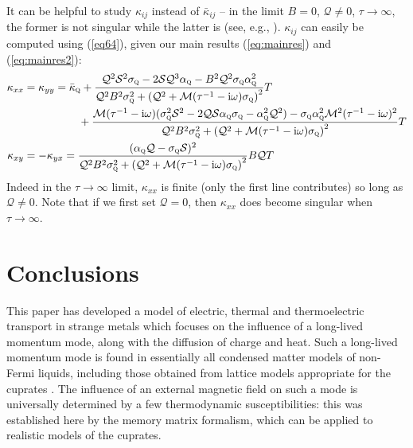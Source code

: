 \documentclass[10pt, oneside]{book}
\begin{document}
\begin{doublespace}
It can be helpful to study $\kappa_{ij}$ instead of $\bar\kappa_{ij}$ -- in the limit $B=0$, $\mathcal{Q}\ne0$, $\tau\rightarrow \infty$,  the former is not singular while the latter is (see, e.g., \cite{rosch2}).   $\kappa_{ij}$ can easily be computed using (\ref{eq64}), given our main results (\ref{eq:mainres}) and (\ref{eq:mainres2}):\begin{subequations}\begin{align}
\kappa_{xx}&=\kappa_{yy} =  \bar\kappa_{\textsc{q}}+\frac{\mathcal{Q}^2\mathcal{S}^2\sigma_{\textsc{q}}-2\mathcal{S}\mathcal{Q}^3\alpha_{\textsc{q}}-B^2\mathcal{Q}^2\sigma_{\textsc{q}}\alpha^2_{\textsc{q}} }{\mathcal{Q}^2B^2\sigma_{\textsc{q}}^2 + \left(\mathcal{Q}^2+ \mathcal{M}(\tau^{-1}-\mathrm{i}\omega)\sigma_{\textsc{q}}\right)^2}   T \notag \\
&\;\;\;\;\;\;\;\;\;\;\;\;\;\;\;\;\;\; +\frac{\mathcal{M}(\tau^{-1}-\mathrm{i}\omega)(\sigma_{\textsc{q}}^2\mathcal{S}^2 - 2\mathcal{QS}\alpha_{\textsc{q}}\sigma_{\textsc{q}}-\alpha^2_{\textsc{q}}\mathcal{Q}^2) - \sigma_{\textsc{q}}\alpha^2_{\textsc{q}}\mathcal{M}^2(\tau^{-1}-\mathrm{i}\omega)^2}{\mathcal{Q}^2B^2\sigma_{\textsc{q}}^2 + \left(\mathcal{Q}^2+ \mathcal{M}(\tau^{-1}-\mathrm{i}\omega)\sigma_{\textsc{q}}\right)^2}T \\
\kappa_{xy} &= -\kappa_{yx} = \frac{(\alpha_{\textsc{q}}\mathcal{Q}-\sigma_{\textsc{q}}\mathcal{S})^2}{\mathcal{Q}^2B^2\sigma_{\textsc{q}}^2 + \left(\mathcal{Q}^2+ \mathcal{M}(\tau^{-1}-\mathrm{i}\omega)\sigma_{\textsc{q}}\right)^2}B\mathcal{Q}T 
\end{align}\end{subequations}
Indeed in the $\tau\rightarrow\infty$ limit, $\kappa_{xx}$ is finite (only the first line contributes) so long as $\mathcal{Q}\ne 0$.    Note that if we first set $\mathcal{Q}=0$, then $\kappa_{xx}$ does become singular when $\tau \rightarrow \infty$.   

\section{Conclusions}
\label{sec:conc}

This paper has developed a model of electric, thermal and thermoelectric transport in strange metals which focuses on the influence of a long-lived momentum mode, along with the diffusion of charge and heat.  
Such a long-lived  momentum mode is found in essentially all condensed matter models of non-Fermi liquids, including those obtained from lattice 
models appropriate for the cuprates \cite{Hartnoll:2014gba,Patel:2014jfa}. The influence of an external magnetic field on such a mode is universally
determined by a few thermodynamic susceptibilities: this was established here by the memory matrix formalism, which can be applied to realistic
models of the cuprates.    


\end{doublespace}
\end{document}
